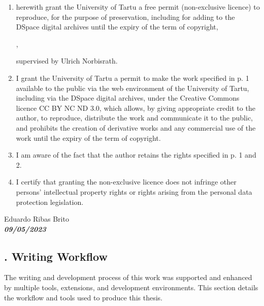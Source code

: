 \begin{enumerate}
\item
herewith grant the University of Tartu a free permit (non-exclusive licence) to
reproduce, for the purpose of preservation, including for adding to the DSpace digital archives until the expiry of the term of copyright,
\par
\textbf{\thesistitle{}}, %
\par
supervised by Ulrich Norbisrath. %
\item
I grant the University of Tartu a permit to make the work specified in p. 1 available to the public via the web environment of the University of Tartu, including via the DSpace digital archives, under the Creative Commons licence CC BY NC ND 3.0, which allows, by giving appropriate credit to the author, to reproduce, distribute the work and communicate it to the public, and prohibits the creation of derivative works and any commercial use of the work until the expiry of the term of copyright.
\item
I am aware of the fact that the author retains the rights specified in p. 1 and 2.
\item
I certify that granting the non-exclusive licence does not infringe other persons' intellectual property rights or rights arising from the personal data protection legislation. 
\end{enumerate}

\noindent
Eduardo Ribas Brito\\ %
\textbf{\textsl{09/05/2023}}





\subsection*{. Writing Workflow} \label{appendix:writing-workflow}


The writing and development process of this work was supported and enhanced by multiple tools, extensions, and development environments. This section details the workflow and tools used to produce this thesis.

